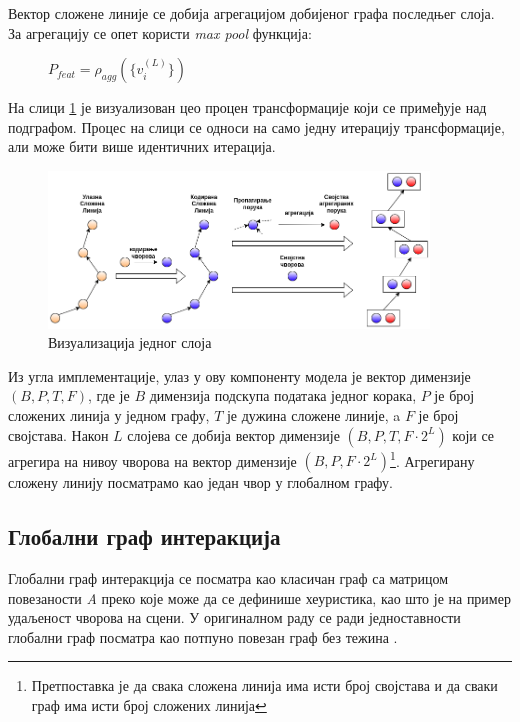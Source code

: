 \documentclass[11pt,oneside]{memoir}
\begin{document}
\noindent Вектор сложене линије се добија агрегацијом добијеног графа последњег слоја. За агрегацију се опет користи \textit{max pool} 
функција:

\begin{figure}[H]
  \centering
  $P_{feat} = \rho_{agg}(\{v^{(L)}_{i}\})$
\end{figure}

На слици \ref{vectornet-subgraph} је визуализован цео процен трансформације који се примеђује над подграфом. Процес на слици се односи на само
једну итерацију трансформације, али може бити више идентичних итерација.

\begin{figure}[H]
  \centering
  \includegraphics[width=0.9\textwidth]{images/vectornet-subgraph-rs.drawio.png}
  \caption{Визуализација једног слоја \label{vectornet-subgraph}}
\end{figure}

Из угла имплементације, улаз у ову компоненту модела је вектор димензије $(B, P, T, F)$, где је $B$ димензија подскупа података једног корака, 
$P$ је број сложених линија у једном графу, $T$ је дужина сложене линије, a $F$ је број својстава. Након $L$ слојева се добија вектор димензије 
$(B, P, T, F \cdot 2^{L})$ који се агрегира на нивоу чворова на вектор димензије
$(B, P, F \cdot 2^{L})$\footnote{Претпоставка је да свака сложена линија има исти број својстава и да сваки граф има исти број сложених линија}. 
Агрегирану сложену линију посматрамо као један чвор у глобалном графу.
         
\subsection{Глобални граф интеракција}

Глобални граф интеракција се посматра као класичан граф са матрицом повезаности \textit{A} преко које може да се дефинише хеуристика, као што је на пример удаљеност
чворова на сцени. У оригиналном раду се ради једноставности глобални граф посматра као потпуно повезан граф без тежина \cite{vectornet}.
\end{document}
